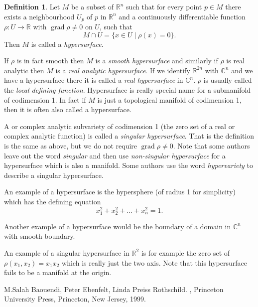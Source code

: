 \documentclass[12pt]{article}
\theoremstyle{theorem}
\theoremstyle{definition}
\newtheorem*{defn}{Definition}
\begin{document}
\begin{defn}
Let $M$ be a subset of ${\mathbb{R}}^n$ such that for every point
$p \in M$ there exists a neighbourhood $U_p$ of $p$ in ${\mathbb{R}}^n$
and a continuously differentiable function $\rho \colon U \to {\mathbb{R}}$ with
$\operatorname{grad} \rho \not= 0$ on $U$,
such that
\begin{equation*}
M \cap U = \{ x \in U \mid \rho(x) = 0 \} .
\end{equation*}
Then $M$ is called a {\em hypersurface}.
\end{defn}

If $\rho$ is in fact smooth then $M$ is a {\em smooth hypersurface} and
similarly if $\rho$ is real analytic then $M$ is a {\em real analytic
hypersurface}.  If
we identify ${\mathbb{R}}^{2n}$ with ${\mathbb{C}}^n$ and we have a
hypersurface there it is called a {\em real hypersurface} in
${\mathbb{C}}^n$.  $\rho$ is usually called the {\em local defining function}.
Hypersurface is really special name for a submanifold of codimension 1.  In fact if $M$ is just a topological manifold of codimension 1, then it is often also called a hypersurface.

A  or complex analytic subvariety of codimension 1 (the zero set of a real or complex analytic function) is called a 
{\em singular hypersurface}.  That is the definition is the same as above, but
we do not require $\operatorname{grad} \rho \not= 0$.  Note that some authors leave out the word {\em singular} and then use {\em non-singular hypersurface} for a hypersurface which is also a manifold.  Some authors use the word {\em hypervariety} to describe a singular hypersurface.

An example of a hypersurface is the hypersphere (of radius 1 for simplicity) which has the defining equation
\begin{equation*}
x_1^2 + x_2^2 + \ldots + x_n^2 = 1 .
\end{equation*}

Another example of a hypersurface would be the boundary of a domain in
${\mathbb{C}}^n$ with smooth boundary.

An example of a singular hypersurface in ${\mathbb{R}}^2$ is for example the zero set
of $\rho(x_1,x_2) = x_1 x_2$ which is really just the two axis.  Note that this
hypersurface fails to be a manifold at the origin.



\begin{thebibliography}{9}
M.\@ Salah Baouendi,
Peter Ebenfelt,
Linda Preiss Rothschild.
{\em {}},
Princeton University Press,
Princeton, New Jersey, 1999.
\end{thebibliography}
\end{document}

